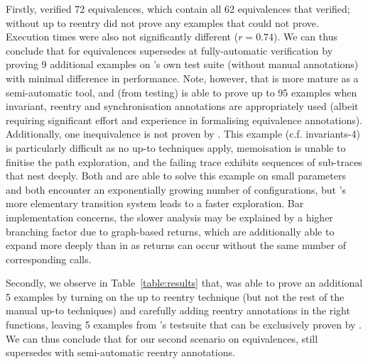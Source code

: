 Firstly, \SLHobbit{} {verified 72 equivalences, which contain all 62 equivalences that \Hobbit{} verified}; without up to reentry \Hobbit{} {did not prove any examples that \SLHobbit{} could not prove.} Execution times were also not significantly different ($r = 0.74$). We can thus conclude that for equivalences \SLHobbit{} supersedes \Hobbit{} at fully-automatic verification by proving 9 additional examples on \Hobbit{}'s own test suite (without manual annotations) with minimal difference in performance. Note, however, that \Hobbit{} is more mature as a semi-automatic tool, and (from testing) is able to prove up to 95 examples when invariant, reentry and synchronisation annotations are appropriately used (albeit requiring significant effort and experience in formalising equivalence annotations). Additionally, one inequivalence is not proven by \SLHobbit{}. This example (c.f. {\small \textsf{invariants-4}}) is particularly difficult as no up-to techniques apply, memoisation is unable to finitise the path exploration, and the failing trace exhibits sequences of sub-traces that nest deeply. Both \SLHobbit{} and \Hobbit{} are able to solve this example on small parameters and both encounter an exponentially growing number of configurations, but \Hobbit{}'s more elementary transition system leads to a faster exploration. Bar implementation concerns, the slower analysis may be explained by a higher branching factor due to graph-based returns, which are additionally able to expand more deeply than in \Hobbit{} as returns can occur without the same number of corresponding calls.


Secondly, we observe in Table~\ref{table:results} that, \Hobbit{} was able to prove an additional 5 examples by turning on the up to reentry technique (but not the rest of the manual up-to techniques) and carefully adding reentry annotations in the right functions, leaving 5 examples from \Hobbit's testsuite that can be exclusively proven by \SLHobbit.
We can thus conclude that for our second scenario on equivalences, \SLHobbit{} still supersedes \Hobbit{} with semi-automatic reentry annotations.

